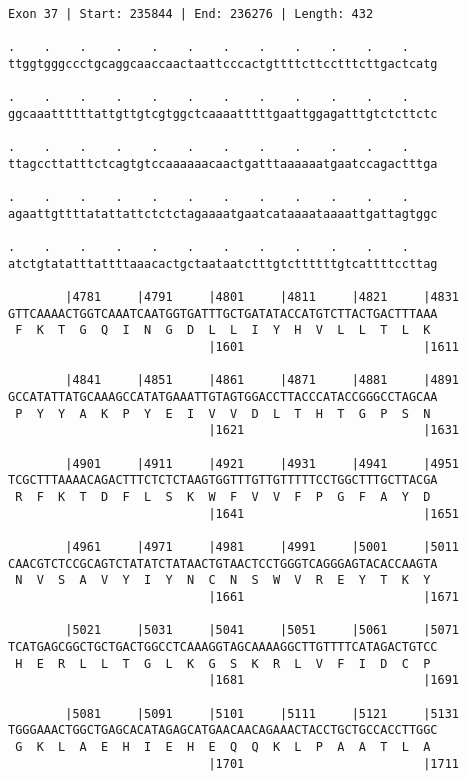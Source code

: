 \documentclass{article}
\begin{document}
\begin{Verbatim}
Exon 37 | Start: 235844 | End: 236276 | Length: 432
 
.    .    .    .    .    .    .    .    .    .    .    .    
ttggtgggccctgcaggcaaccaactaattcccactgttttcttcctttcttgactcatg
  
.    .    .    .    .    .    .    .    .    .    .    .    
ggcaaattttttattgttgtcgtggctcaaaatttttgaattggagatttgtctcttctc
  
.    .    .    .    .    .    .    .    .    .    .    .    
ttagccttatttctcagtgtccaaaaaacaactgatttaaaaaatgaatccagactttga
  
.    .    .    .    .    .    .    .    .    .    .    .    
agaattgttttatattattctctctagaaaatgaatcataaaataaaattgattagtggc
  
.    .    .    .    .    .    .    .    .    .    .    .    
atctgtatatttattttaaacactgctaataatctttgtcttttttgtcattttccttag
  
        |4781     |4791     |4801     |4811     |4821     |4831
GTTCAAAACTGGTCAAATCAATGGTGATTTGCTGATATACCATGTCTTACTGACTTTAAA
 F  K  T  G  Q  I  N  G  D  L  L  I  Y  H  V  L  L  T  L  K 
                            |1601                         |1611
  
        |4841     |4851     |4861     |4871     |4881     |4891
GCCATATTATGCAAAGCCATATGAAATTGTAGTGGACCTTACCCATACCGGGCCTAGCAA
 P  Y  Y  A  K  P  Y  E  I  V  V  D  L  T  H  T  G  P  S  N 
                            |1621                         |1631
  
        |4901     |4911     |4921     |4931     |4941     |4951
TCGCTTTAAAACAGACTTTCTCTCTAAGTGGTTTGTTGTTTTTCCTGGCTTTGCTTACGA
 R  F  K  T  D  F  L  S  K  W  F  V  V  F  P  G  F  A  Y  D 
                            |1641                         |1651
  
        |4961     |4971     |4981     |4991     |5001     |5011
CAACGTCTCCGCAGTCTATATCTATAACTGTAACTCCTGGGTCAGGGAGTACACCAAGTA
 N  V  S  A  V  Y  I  Y  N  C  N  S  W  V  R  E  Y  T  K  Y 
                            |1661                         |1671
  
        |5021     |5031     |5041     |5051     |5061     |5071
TCATGAGCGGCTGCTGACTGGCCTCAAAGGTAGCAAAAGGCTTGTTTTCATAGACTGTCC
 H  E  R  L  L  T  G  L  K  G  S  K  R  L  V  F  I  D  C  P 
                            |1681                         |1691
  
        |5081     |5091     |5101     |5111     |5121     |5131
TGGGAAACTGGCTGAGCACATAGAGCATGAACAACAGAAACTACCTGCTGCCACCTTGGC
 G  K  L  A  E  H  I  E  H  E  Q  Q  K  L  P  A  A  T  L  A 
                            |1701                         |1711
  

\end{Verbatim}
\end{document}
